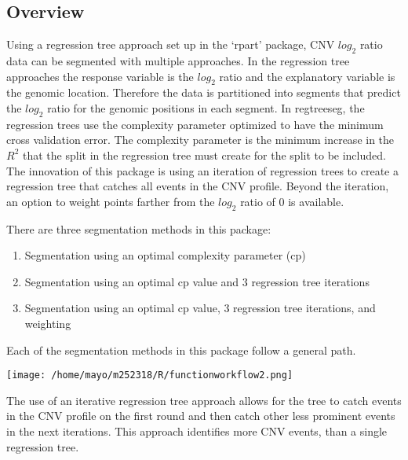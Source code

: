 \documentclass[
]{article}
\begin{document}
\hypertarget{overview}{%
\subsection{Overview}\label{overview}}

Using a regression tree approach set up in the `rpart' package, CNV
\(log_2\) ratio data can be segmented with multiple approaches. In the
regression tree approaches the response variable is the \(log_2\) ratio
and the explanatory variable is the genomic location. Therefore the data
is partitioned into segments that predict the \(log_2\) ratio for the
genomic positions in each segment. In regtreeseg, the regression trees
use the complexity parameter optimized to have the minimum cross
validation error. The complexity parameter is the minimum increase in
the \(R^2\) that the split in the regression tree must create for the
split to be included. The innovation of this package is using an
iteration of regression trees to create a regression tree that catches
all events in the CNV profile. Beyond the iteration, an option to weight
points farther from the \(log_2\) ratio of 0 is available.

There are three segmentation methods in this package:

\begin{enumerate}
\def\labelenumi{\arabic{enumi}.}
\item
  Segmentation using an optimal complexity parameter (cp)
\item
  Segmentation using an optimal cp value and 3 regression tree
  iterations
\item
  Segmentation using an optimal cp value, 3 regression tree iterations,
  and weighting
\end{enumerate}

Each of the segmentation methods in this package follow a general path.

\begin{center}\texttt{[image: /home/mayo/m252318/R/functionworkflow2.png]} \end{center}

The use of an iterative regression tree approach allows for the tree to
catch events in the CNV profile on the first round and then catch other
less prominent events in the next iterations. This approach identifies
more CNV events, than a single regression tree.
\end{document}
